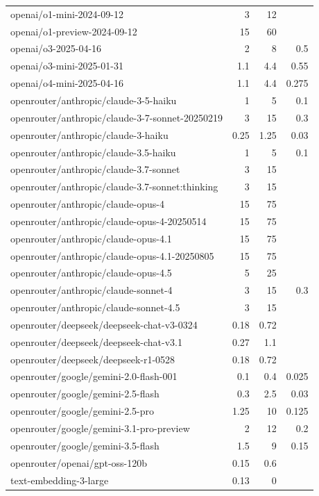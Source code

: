 \begin{longtable}{lrrr}
openai/o1-mini-2024-09-12 & 3 & 12 &  \\
openai/o1-preview-2024-09-12 & 15 & 60 &  \\
openai/o3-2025-04-16 & 2 & 8 & 0.5 \\
openai/o3-mini-2025-01-31 & 1.1 & 4.4 & 0.55 \\
openai/o4-mini-2025-04-16 & 1.1 & 4.4 & 0.275 \\
openrouter/anthropic/claude-3-5-haiku & 1 & 5 & 0.1 \\
openrouter/anthropic/claude-3-7-sonnet-20250219 & 3 & 15 & 0.3 \\
openrouter/anthropic/claude-3-haiku & 0.25 & 1.25 & 0.03 \\
openrouter/anthropic/claude-3.5-haiku & 1 & 5 & 0.1 \\
openrouter/anthropic/claude-3.7-sonnet & 3 & 15 &  \\
openrouter/anthropic/claude-3.7-sonnet:thinking & 3 & 15 &  \\
openrouter/anthropic/claude-opus-4 & 15 & 75 &  \\
openrouter/anthropic/claude-opus-4-20250514 & 15 & 75 &  \\
openrouter/anthropic/claude-opus-4.1 & 15 & 75 &  \\
openrouter/anthropic/claude-opus-4.1-20250805 & 15 & 75 &  \\
openrouter/anthropic/claude-opus-4.5 & 5 & 25 &  \\
openrouter/anthropic/claude-sonnet-4 & 3 & 15 & 0.3 \\
openrouter/anthropic/claude-sonnet-4.5 & 3 & 15 &  \\
openrouter/deepseek/deepseek-chat-v3-0324 & 0.18 & 0.72 &  \\
openrouter/deepseek/deepseek-chat-v3.1 & 0.27 & 1.1 &  \\
openrouter/deepseek/deepseek-r1-0528 & 0.18 & 0.72 &  \\
openrouter/google/gemini-2.0-flash-001 & 0.1 & 0.4 & 0.025 \\
openrouter/google/gemini-2.5-flash & 0.3 & 2.5 & 0.03 \\
openrouter/google/gemini-2.5-pro & 1.25 & 10 & 0.125 \\
openrouter/google/gemini-3.1-pro-preview & 2 & 12 & 0.2 \\
openrouter/google/gemini-3.5-flash & 1.5 & 9 & 0.15 \\
openrouter/openai/gpt-oss-120b & 0.15 & 0.6 &  \\
text-embedding-3-large & 0.13 & 0 &  \\

\end{longtable}

